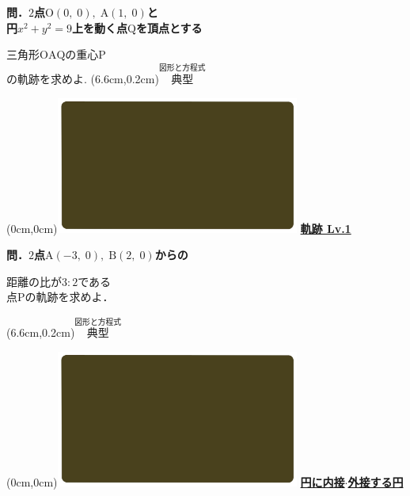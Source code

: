 \documentclass[10pt,
fleqn,
dvipdfmx,
uplatex
]{jsarticle}
\begin{document}
\normalsize
\bf\boldmath 問．$2$点$\text{O}\left(0,\;0\right),\;\text{A}\left(1,\;0\right)$と\\
\hfill 円$x^2+y^2=9$上を動く点$\text{Q}$を頂点とする

\huge
\hspace{0.0zw}三角形$\text{OAQ}$の重心$\text{P}$\\
\hfill の軌跡を求めよ.
\at(6.6cm,0.2cm){\small\color{bradorange}$\overset{\text{図形と方程式}}{\text{典型}}$}

\newpage

\at(0cm,0cm){\includegraphics[width=8cm,bb=0 0 1920 1080]{./youtube/thumbnails/templates/smart_background/図形と方程式.jpeg}}
{\color{orange}\bf\boldmath\huge\underline{軌跡 Lv.1}}\vspace{0.5zw}

\large 
\bf\boldmath 問．$2$点$\text{A}\left(-3,\;0\right),\;\text{B}\left(2,\;0\right)$からの

\huge
\vspace{0.2zw}
\hspace{0.0zw}
距離の比が$3:2$である\\
\hfill 点$\text{P}$の軌跡を求めよ．

\at(6.6cm,0.2cm){\small\color{bradorange}$\overset{\text{図形と方程式}}{\text{典型}}$}

\newpage

\at(0cm,0cm){\includegraphics[width=8cm,bb=0 0 1920 1080]{./youtube/thumbnails/templates/smart_background/図形と方程式.jpeg}}
{\color{orange}\bf\boldmath\LARGE\underline{円に内接$\cdot$外接する円}}\vspace{0.3zw}
\end{document}

